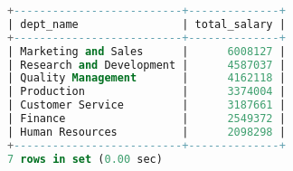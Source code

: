 \documentclass[12pt]{article}
\begin{document}
\begin{itemize}
\begin{lstlisting}[language=SQL]
+--------------------------+--------------+
| dept_name                | total_salary |
+--------------------------+--------------+
| Marketing and Sales      |      6008127 |
| Research and Development |      4587037 |
| Quality Management       |      4162118 |
| Production               |      3374004 |
| Customer Service         |      3187661 |
| Finance                  |      2549372 |
| Human Resources          |      2098298 |
+--------------------------+--------------+
7 rows in set (0.00 sec)

\end{lstlisting}

\end{itemize}



 
\end{document}
